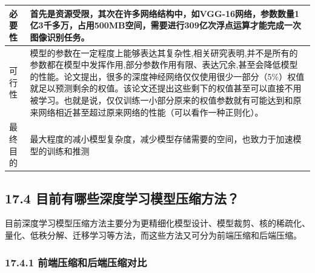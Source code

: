 \begin{longtable}[]{ ll }
\toprule
\begin{minipage}[b]{0.12\columnwidth}\raggedright\strut
必要性\strut
\end{minipage} & \begin{minipage}[b]{0.80\columnwidth}\raggedright\strut
首先是资源受限，其次在许多网络结构中，如VGG-16网络，参数数量1亿3千多万，占用500MB空间，需要进行309亿次浮点运算才能完成一次图像识别任务。\strut
\end{minipage}\tabularnewline
\midrule
\endhead
\begin{minipage}[t]{0.12\columnwidth}\raggedright\strut
可行性\strut
\end{minipage} & \begin{minipage}[t]{0.80\columnwidth}\raggedright\strut
模型的参数在一定程度上能够表达其复杂性,相关研究表明,并不是所有的参数都在模型中发挥作用,部分参数作用有限、表达冗余,甚至会降低模型的性能。论文提出，很多的深度神经网络仅仅使用很少一部分（5\%）权值就足以预测剩余的权值。该论文还提出这些剩下的权值甚至可以直接不用被学习。也就是说，仅仅训练一小部分原来的权值参数就有可能达到和原来网络相近甚至超过原来网络的性能（可以看作一种正则化）。\strut
\end{minipage}\tabularnewline
\begin{minipage}[t]{0.12\columnwidth}\raggedright\strut
最终目的\strut
\end{minipage} & \begin{minipage}[t]{0.80\columnwidth}\raggedright\strut
最大程度的减小模型复杂度，减少模型存储需要的空间，也致力于加速模型的训练和推测\strut
\end{minipage}\tabularnewline
\bottomrule
\end{longtable}

\subsection{17.4
目前有哪些深度学习模型压缩方法？}\label{ux76eeux524dux6709ux54eaux4e9bux6df1ux5ea6ux5b66ux4e60ux6a21ux578bux538bux7f29ux65b9ux6cd5}

​
目前深度学习模型压缩方法主要分为更精细化模型设计、模型裁剪、核的稀疏化、量化、低秩分解、迁移学习等方法，而这些方法又可分为前端压缩和后端压缩。

\subsubsection{17.4.1
前端压缩和后端压缩对比}\label{ux524dux7aefux538bux7f29ux548cux540eux7aefux538bux7f29ux5bf9ux6bd4}

